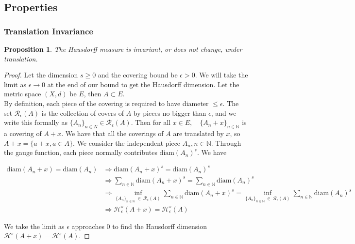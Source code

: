 \documentclass{article}
\newtheorem{proposition}{Proposition}
\begin{document}
\subsection{Properties}

\subsubsection{Translation Invariance}

\begin{proposition}
    The Hausdorff measure is invariant, or does not change, under translation.
\end{proposition}

\begin{proof}
    Let the dimension $s \geq 0$ and the covering bound be $\epsilon >0$. We will take the limit as $\epsilon \to 0$ at the end of our bound to get the Hausdorff dimension. Let the metric space $(X, d)$ be $E$, then $A \subset E$. \\

    By definition, each piece of the covering is required to have diameter $\leq \epsilon$. The set $\mathcal{R}_{\epsilon} (A)$ is the collection of covers of $A$ by pieces no bigger than $\epsilon$, and we write this formally as $\{A_n\}_{n \in N} \in \mathcal{R}_{\epsilon}(A)$. Then for all $x \in E, \quad \{A_n+x\}_{n \in \mathbb{N}}$ is a covering of $A+x$. We have that all the coverings of $A$ are translated by $x$, so $A+x = \{ a+x, a\in A\}$. We consider the independent piece $A_n, n\in \mathbb{N}$. Through the gauge function, each piece normally contributes $\text{diam}(A_n)^{s}$. We have 

\begin{align*}
    \text{diam}(A_n + x) = \text{diam}(A_n) &\Rightarrow \text{diam}(A_n+x)^{s} = \text{diam}(A_n)^{s} \\
    &\Rightarrow \sum_{n \in \mathbb{N}} \text{diam} (A_n+x)^{s} = \sum_{n \in \mathbb{N}} \text{diam} (A_n)^{s} \\
    &\Rightarrow \inf_{\{A_n\}_{n\in \mathbb{N}} \  \in \  \mathcal{R}_{\epsilon}(A)} \sum_{n \in \mathbb{N}} \text{diam}(A_n+x)^{s} = \inf_{\{A_n\}_{n \in \mathbb{N}} \ \in \ \mathcal{R}_{\epsilon}(A)} \sum_{n \in \mathbb{N}} \text{diam} (A_n)^{s} \\
    &\Rightarrow \mathcal{H}_{\epsilon}^{s}(A+x) = \mathcal{H}_{\epsilon}^{s}(A)
\end{align*}

We take the limit as $\epsilon$ approaches $0$ to find the Hausdorff dimension $\mathcal{H}^{s}(A+x) = \mathcal{H}^{s}(A)$.
\end{proof}
\end{document}
